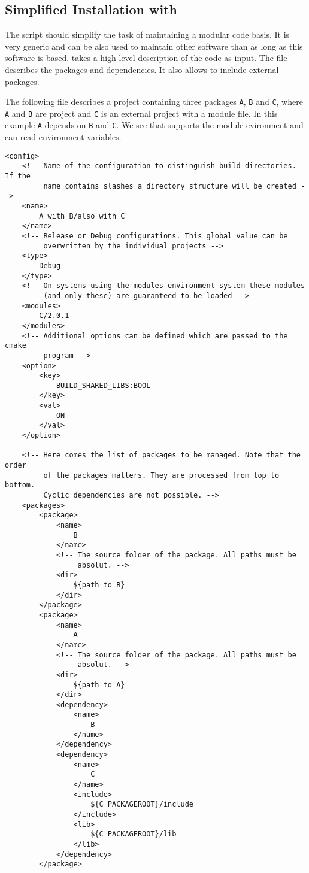 \subsection{Simplified Installation with \BUILDPY}

The \PYTHON script \BUILDPY should simplify the task of maintaining a modular code basis. It is very generic and can be also used to  maintain other software than \MACI as long as this software is \CMAKE based. \BUILDPY takes a high-level \XML description of the code as input. The \XML file describes the packages and dependencies. It also allows to include external packages.

The following \XML file describes a project containing three packages \lstinline[style=XML]|A|, \lstinline[style=XML]|B| and \lstinline[style=XML]|C|, where \lstinline[style=XML]|A| and \lstinline[style=XML]|B| are \CMAKE project and \lstinline[style=XML]|C| is an external project with a module file. In this example \lstinline[style=XML]|A| depends on \lstinline[style=XML]|B| and \lstinline[style=XML]|C|. We see that \BUILDPY supports the module evironment and can read environment variables.

\vspace{1pt}
\begin{lstlisting}[style=XML_SMALL,frame=lines]
<config>
	<!-- Name of the configuration to distinguish build directories. If the
	     name contains slashes a directory structure will be created -->
	<name>
		A_with_B/also_with_C
	</name>
	<!-- Release or Debug configurations. This global value can be
	     overwritten by the individual projects -->
	<type>
		Debug
	</type>
	<!-- On systems using the modules environment system these modules
	     (and only these) are guaranteed to be loaded -->
	<modules>
		C/2.0.1
	</modules>
	<!-- Additional options can be defined which are passed to the cmake
	     program -->
	<option>
		<key>
			BUILD_SHARED_LIBS:BOOL
		</key>
		<val>
			ON
		</val>
	</option>

	<!-- Here comes the list of packages to be managed. Note that the order
	     of the packages matters. They are processed from top to bottom. 
	     Cyclic dependencies are not possible. -->
	<packages>
		<package>
			<name>
				B
			</name>
			<!-- The source folder of the package. All paths must be
			     absolut. -->
			<dir>
				${path_to_B}
			</dir>
		</package>
		<package>
			<name>
				A
			</name>
			<!-- The source folder of the package. All paths must be
			     absolut. -->
			<dir>
				${path_to_A}
			</dir>
			<dependency>
				<name>
					B
				</name>
			</dependency>
			<dependency>
				<name>
					C
				</name>
				<include>
					${C_PACKAGEROOT}/include
				</include>
				<lib>
					${C_PACKAGEROOT}/lib
				</lib>
			</dependency>
		</package>
\end{lstlisting}

